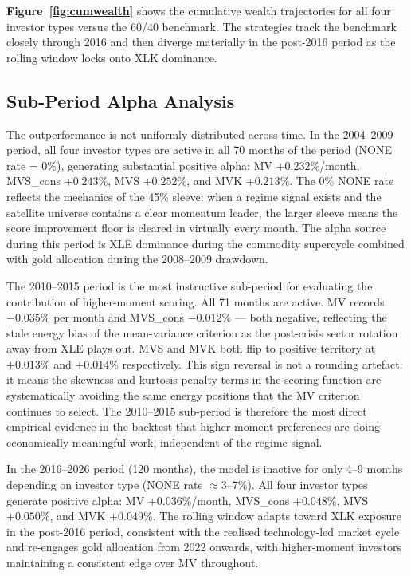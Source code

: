 \documentclass[12pt, a4paper]{article}
\begin{document}
\textbf{Figure~\ref{fig:cumwealth}} shows the cumulative wealth trajectories for all four investor types versus the 60/40 benchmark. The strategies track the benchmark closely through 2016 and then diverge materially in the post-2016 period as the rolling window locks onto XLK dominance.


\subsection{Sub-Period Alpha Analysis}

 The outperformance is not uniformly distributed across time. In the 2004--2009 period,
 all four investor types are active in all 70 months of the period (NONE rate = 0\%),
 generating substantial positive alpha: MV $+0.232\%$/month, MVS\_cons $+0.243\%$,
 MVS $+0.252\%$, and MVK $+0.213\%$. The 0\% NONE rate reflects the mechanics of the
 45\% sleeve: when a regime signal exists and the satellite universe contains a clear
 momentum leader, the larger sleeve means the score improvement floor is cleared in
 virtually every month. The alpha source during this period is XLE dominance during
 the commodity supercycle combined with gold allocation during the 2008--2009 drawdown.

 The 2010--2015 period is the most instructive sub-period for evaluating the contribution
 of higher-moment scoring. All 71 months are active. MV records $-0.035\%$ per month
 and MVS\_cons $-0.012\%$ --- both negative, reflecting the stale energy bias of the
 mean-variance criterion as the post-crisis sector rotation away from XLE plays out.
 MVS and MVK both flip to positive territory at $+0.013\%$ and $+0.014\%$ respectively.
 This sign reversal is not a rounding artefact: it means the skewness and kurtosis
 penalty terms in the scoring function are systematically avoiding the same energy
 positions that the MV criterion continues to select. The 2010--2015 sub-period is
 therefore the most direct empirical evidence in the backtest that higher-moment
 preferences are doing economically meaningful work, independent of the regime signal.

 In the 2016--2026 period (120 months), the model is inactive for only 4--9 months
 depending on investor type (NONE rate $\approx$3--7\%). All four investor types
 generate positive alpha: MV $+0.036\%$/month, MVS\_cons $+0.048\%$, MVS $+0.050\%$,
 and MVK $+0.049\%$. The rolling window adapts toward XLK exposure in the post-2016 period, consistent with
 the realised technology-led market cycle and re-engages gold allocation from 2022 onwards,
 with higher-moment investors maintaining a consistent edge over MV throughout.
\end{document}
